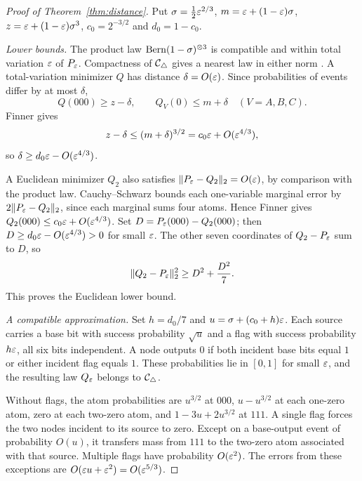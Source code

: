 \begin{proof}[Proof of Theorem~\ref{thm:distance}]
Put $\sigma=\tfrac12\varepsilon^{2/3}$, $m=\varepsilon+(1-\varepsilon)\sigma$, $z=\varepsilon+(1-\varepsilon)\sigma^3$, $c_0=2^{-3/2}$ and $d_0=1-c_0$.

\emph{Lower bounds.} The product law $\operatorname{Bern}(1-\sigma)^{\otimes3}$ is compatible and within total variation $\varepsilon$ of $P_\varepsilon$. Compactness of $\mathcal C_{\triangle}$ gives a nearest law in either norm \cite{RGW2018}. A total-variation minimizer $Q$ has distance $\delta=O(\varepsilon)$. Since probabilities of events differ by at most $\delta$,
\[
Q(000)\ge z-\delta,\qquad Q_V(0)\le m+\delta\quad(V=A,B,C).
\]
Finner gives
\[
z-\delta\le(m+\delta)^{3/2}
 =c_0\varepsilon+O(\varepsilon^{4/3}),
\]
so $\delta\ge d_0\varepsilon-O(\varepsilon^{4/3})$.

A Euclidean minimizer $Q_2$ also satisfies $\|P_\varepsilon-Q_2\|_2=O(\varepsilon)$, by comparison with the product law. Cauchy--Schwarz bounds each one-variable marginal error by $2\|P_\varepsilon-Q_2\|_2$, since each marginal sums four atoms. Hence Finner gives $Q_2(000)\le c_0\varepsilon+O(\varepsilon^{4/3})$. Set $D=P_\varepsilon(000)-Q_2(000)$; then $D\ge d_0\varepsilon-O(\varepsilon^{4/3})>0$ for small $\varepsilon$. The other seven coordinates of $Q_2-P_\varepsilon$ sum to $D$, so
\[
\|Q_2-P_\varepsilon\|_2^2\ge D^2+\frac{D^2}{7}.
\]
This proves the Euclidean lower bound.

\emph{A compatible approximation.} Set $h=d_0/7$ and $u=\sigma+(c_0+h)\varepsilon$. Each source carries a base bit with success probability $\sqrt u$ and a flag with success probability $h\varepsilon$, all six bits independent. A node outputs $0$ if both incident base bits equal $1$ or either incident flag equals $1$. These probabilities lie in $[0,1]$ for small $\varepsilon$, and the resulting law $Q_\varepsilon$ belongs to $\mathcal C_{\triangle}$.

Without flags, the atom probabilities are $u^{3/2}$ at $000$, $u-u^{3/2}$ at each one-zero atom, zero at each two-zero atom, and $1-3u+2u^{3/2}$ at $111$. A single flag forces the two nodes incident to its source to zero. Except on a base-output event of probability $O(u)$, it transfers mass from $111$ to the two-zero atom associated with that source. Multiple flags have probability $O(\varepsilon^2)$. The errors from these exceptions are $O(\varepsilon u+\varepsilon^2)=O(\varepsilon^{5/3})$.


\end{proof}
